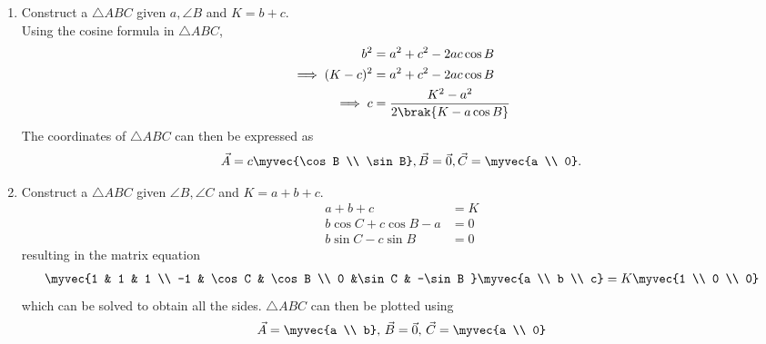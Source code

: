 \begin{enumerate}[label=\thesubsection.\arabic*.,ref=\thesubsection.\theenumi]
\item Construct a $\triangle ABC$ given $a, \angle B$ and $K = b+c$.
		\label{prob:9/11/2/1}
	\\
	\solution 
	Using the cosine formula in  $\triangle ABC$,
\begin{align}
	{b}^2&= {a}^2 + {c}^2 - 2ac\cos{B}
\\
\implies	(K-c)^2 &= {a}^2 + c^2- 2  a  c\cos{B}
\\
\implies
	c &=
	\frac{K^2-a^2}{2\brak{K- a  \cos{B}}}
		\label{eq:9/11/2/1}
\end{align}
The coordinates of $\triangle ABC$ can then be expressed as
\begin{align}
		\label{eq:9/11/2/1-final}
	\vec{A}=c\myvec{\cos B \\ \sin B},
	\vec{B} = \vec{0},
	\vec{C} =\myvec{a \\ 0}.
\end{align}
\item Construct a $\triangle ABC$ given $\angle B, \angle C$ and $K = a+b+c$.
	\\
	\solution
	\begin{align}
a+b+c &= K \\
b\cos C + c \cos B -a &=0 \\
b\sin C - c \sin B &=0
\end{align}
resulting in the matrix equation
\begin{align}
		\label{eq:9/11/2/4}
	\myvec{1 & 1 & 1 \\ -1 & \cos C & \cos B  \\ 0 &\sin C & -\sin B } \myvec{a \\ b \\ c} = K \myvec{1 \\ 0 \\ 0}
\end{align}
which can be solved to obtain all the sides.  $\triangle ABC$ can then be plotted using
\begin{align}
\vec{A} = \myvec{a \\ b},\,
\vec{B} = \vec{0},\, 
\vec{C} = \myvec{a \\ 0}
		\label{eq:9/11/2/4-final}
\end{align}
\end{enumerate}
